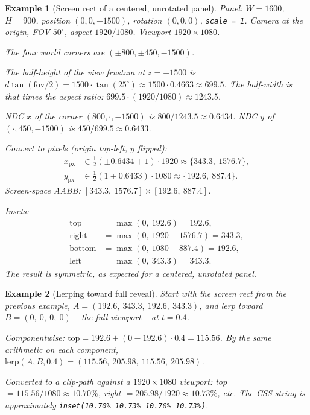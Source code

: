 \documentclass{article}
\newtheorem{example}{Example}
\begin{document}
\begin{example}[Screen rect of a centered, unrotated panel]
Panel: $W = 1600$, $H = 900$, position $(0, 0, -1500)$, rotation $(0, 0, 0)$,
\texttt{scale = 1}. Camera at the origin, FOV $50^\circ$, aspect $1920/1080$.
Viewport $1920 \times 1080$.

The four world corners are $(\pm 800, \pm 450, -1500)$.

The half-height of the view frustum at $z = -1500$ is
$d \tan(\mathrm{fov}/2) = 1500 \cdot \tan(25^\circ) \approx 1500 \cdot 0.4663 \approx 699.5$.
The half-width is that times the aspect ratio:
$699.5 \cdot (1920/1080) \approx 1243.5$.

NDC $x$ of the corner $(800, \cdot, -1500)$ is $800 / 1243.5 \approx 0.6434$. NDC $y$ of
$(\cdot, 450, -1500)$ is $450 / 699.5 \approx 0.6433$.

Convert to pixels (origin top-left, $y$ flipped):
\begin{align*}
  x_{\mathrm{px}} &\in \tfrac{1}{2}(\pm 0.6434 + 1) \cdot 1920
                  \approx \{343.3,\ 1576.7\}, \\
  y_{\mathrm{px}} &\in \tfrac{1}{2}(1 \mp 0.6433) \cdot 1080
                  \approx \{192.6,\ 887.4\}.
\end{align*}
Screen-space AABB: $[343.3,\ 1576.7] \times [192.6,\ 887.4]$.

Insets:
\begin{align*}
  \text{top}    &= \max(0,\ 192.6) = 192.6, \\
  \text{right}  &= \max(0,\ 1920 - 1576.7) = 343.3, \\
  \text{bottom} &= \max(0,\ 1080 - 887.4) = 192.6, \\
  \text{left}   &= \max(0,\ 343.3) = 343.3.
\end{align*}
The result is symmetric, as expected for a centered, unrotated panel.
\end{example}

\begin{example}[Lerping toward full reveal]
Start with the screen rect from the previous example,
$A = (192.6,\ 343.3,\ 192.6,\ 343.3)$, and lerp toward
$B = (0,\ 0,\ 0,\ 0)$ -- the full viewport -- at $t = 0.4$.

Componentwise: $\mathrm{top} = 192.6 + (0 - 192.6) \cdot 0.4 = 115.56$.
By the same arithmetic on each component,
$\mathrm{lerp}(A, B, 0.4) = (115.56,\ 205.98,\ 115.56,\ 205.98)$.

Converted to a clip-path against a $1920 \times 1080$ viewport:
top $= 115.56 / 1080 \approx 10.70\%$, right $= 205.98 / 1920 \approx 10.73\%$, etc.
The CSS string is approximately \texttt{inset(10.70\% 10.73\% 10.70\% 10.73\%)}.
\end{example}
\end{document}

